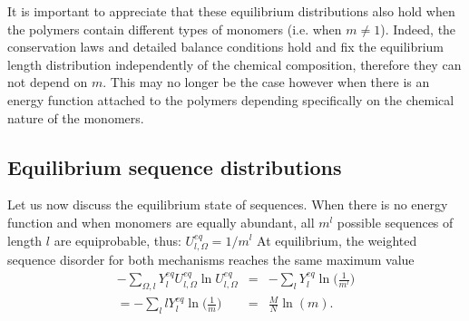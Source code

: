 \documentclass[
	amsmath,
	amssymb,
	a4paper,
	aip,		%
	jcp,		%
	reprint, twocolumn  %
	fleqn,
	showpacs,
	floatfix
]{revtex4-1}
\newcommand{\bea}{\begin{eqnarray}}
\newcommand{\eea}{\end{eqnarray}}
\begin{document}
It is important to appreciate that these equilibrium distributions also hold when the polymers contain
different types of monomers (i.e. when $m \ne 1$). Indeed, the 
conservation laws and detailed balance conditions hold and fix the equilibrium 
length distribution independently of the chemical composition, therefore they can not depend on $m$. 
This may no longer be the case however  
when there is an energy function attached to the polymers depending specifically on 
the chemical nature of the monomers.

\subsection{Equilibrium sequence distributions}
Let us now discuss the equilibrium state of sequences. When there is no energy function and 
when monomers are equally abundant, all $m^{l}$ possible sequences of length $l$ are equiprobable, 
thus:  $U^{eq}_{l,\Omega}=1 / m^{l}$ At equilibrium, the weighted sequence disorder for both mechanisms reaches the same maximum value
\bea
\nonumber  - \sum_{\Omega,l} Y^{eq}_{l}  U^{eq}_{l,\Omega} \ln U^{eq}_{l,\Omega} &=& - \sum_{l} 
Y_l^{eq} \ln \Big( \frac{1}{m^{l}} \Big) \label{seqdistot} \\   
= - \sum_{l} l Y_l^{eq} \ln \Big( \frac{1}{m} \Big) &=& \frac{ M}{N} \ln(m).
\eea
\end{document}
